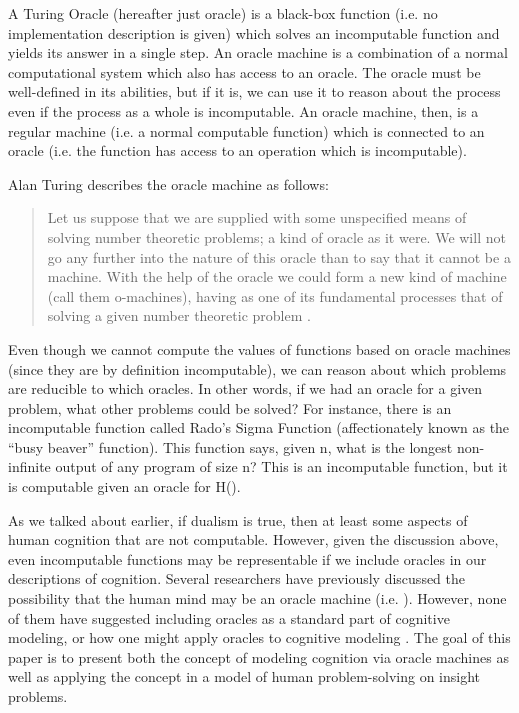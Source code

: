 A Turing Oracle (hereafter just oracle) is a black-box function (i.e. no implementation description is given) which solves an incomputable function and yields its answer in a single step.  An oracle machine is a combination of a normal computational system which also has access to an oracle.  The oracle must be well-defined in its abilities, but if it is, we can use it to reason about the process even if the process as a whole is incomputable.  An oracle machine, then, is a regular machine (i.e. a normal computable function) which is connected to an oracle (i.e. the function has access to an operation which is incomputable).

Alan Turing describes the oracle machine as follows:

\begin{quote}
Let us suppose that we are supplied with some unspecified means of solving number theoretic problems; a kind of oracle as it were.  We will not go any further into the nature of this oracle than to say that it cannot be a machine.  With the help of the oracle we could form a new kind of machine (call them o-machines), having as one of its fundamental processes that of solving a given number theoretic problem \citep{turing1939}.
\end{quote}

Even though we cannot compute the values of functions based on oracle machines (since they are by definition incomputable), we can reason about which problems are reducible to which oracles.  In other words, if we had an oracle for a given problem, what other problems could be solved?  For instance, there is an incomputable function called Rado's Sigma Function (affectionately known as the ``busy beaver'' function).  This function says, given n, what is the longest non-infinite output of any program of size n?  This is an incomputable function, but it is computable given an oracle for H().

As we talked about earlier, if dualism is true, then at least some aspects of human cognition that are not computable.  However, given the discussion above, even incomputable functions may be representable if we include oracles in our descriptions of cognition.  Several researchers have previously discussed the possibility that the human mind may be an oracle machine (i.e. \citet{copeland1998}).  However, none of them have suggested including oracles as a standard part of cognitive modeling, or how one might apply oracles to cognitive modeling \citep{bartlett2010a, bartlett2010b}. The goal of this paper is to present both the concept of modeling cognition via oracle machines as well as applying the concept in a model of human problem-solving on insight problems.

